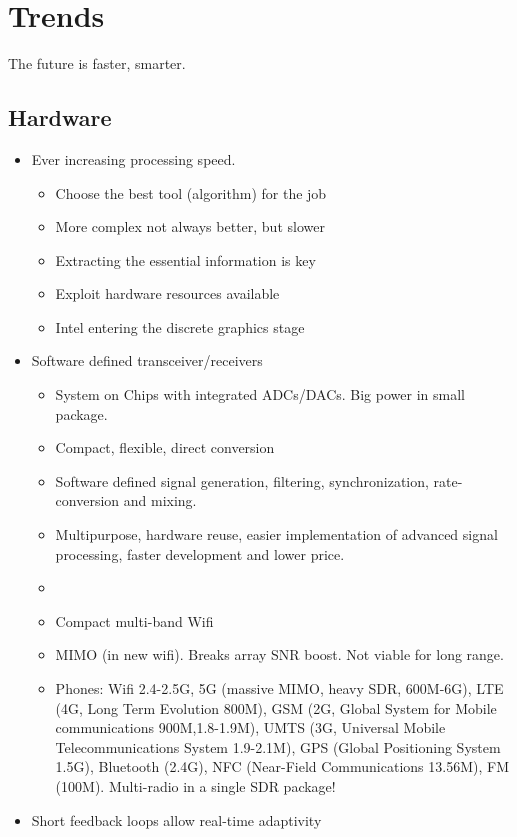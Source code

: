 \section{Trends}

The future is faster, smarter.

\subsection{Hardware}

\begin{itemize}
\item Ever increasing processing speed.
\begin{itemize}
	\item Choose the best tool (algorithm) for the job
	\item More complex not always better, but slower
	\item Extracting the essential information is key 
	\item Exploit hardware resources available
   \item Intel entering the discrete graphics stage
   \end{itemize}
\item Software defined transceiver/receivers
\begin{itemize}
\item System on Chips with integrated ADCs/DACs. Big power in small package.
\item Compact, flexible, direct conversion
\item Software defined signal generation, filtering, synchronization, rate-conversion and mixing.
\item Multipurpose, hardware reuse, easier implementation of advanced signal processing, faster development and lower price.
\item 
\item Compact multi-band Wifi
\item MIMO (in new wifi). Breaks array SNR boost. Not viable for long range.
\item Phones: Wifi 2.4-2.5G, 5G (massive MIMO, heavy SDR, 600M-6G), LTE (4G, Long Term Evolution 800M), GSM (2G, Global System for Mobile communications 900M,1.8-1.9M), UMTS (3G, Universal Mobile Telecommunications System 1.9-2.1M), GPS (Global Positioning System 1.5G), Bluetooth (2.4G), NFC (Near-Field Communications 13.56M), FM (100M). Multi-radio in a single SDR package!
\end{itemize}
\item Short feedback loops allow real-time adaptivity
\end{itemize}


